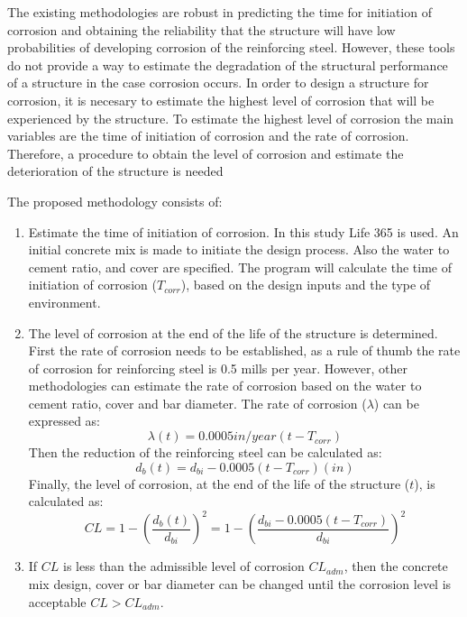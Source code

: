 The existing methodologies are robust in predicting the time for initiation of corrosion and obtaining the reliability that the structure will have low probabilities of developing corrosion of the reinforcing steel. However, these tools do not provide a way to estimate the degradation of the structural performance of a structure in the case corrosion occurs. In order to design a structure for corrosion, it is necesary to estimate the highest level of corrosion that will be experienced by the structure. To estimate the highest level of corrosion the main variables are the time of initiation of corrosion and the rate of corrosion. Therefore, a procedure to obtain the level of corrosion and estimate the deterioration of the structure is needed

The proposed methodology consists of:
\begin{enumerate}
    \item Estimate the time of initiation of corrosion. In this study Life 365 is used. An initial concrete mix is made to initiate the design process. Also the water to cement ratio, and cover are specified. The program will calculate the time of initiation of corrosion ($T_{corr}$), based on the design inputs and the type of environment.
    \item The level of corrosion at the end of the life of the structure is determined. First the rate of corrosion needs to be established, as a rule of thumb the rate of corrosion for reinforcing steel is 0.5 mills per year. However, other methodologies can estimate the rate of corrosion based on the water to cement ratio, cover and bar diameter\cite{Weyers1994}\cite{Thoft-Christensen}. The rate of corrosion ($\lambda$) can be expressed as:
    \begin{equation}
        \lambda(t)=0.0005 in/year (t-T_{corr})
    \end{equation}
    Then the reduction of the reinforcing steel can be calculated as:
    \begin{equation}
    d_{b}(t)=d_{bi}-0.0005(t-T_{corr}) (in)
    \end{equation}
    Finally, the level of corrosion, at the end of the life of the structure ($t$), is calculated as:
    \begin{equation}
    CL=1-\left(\frac{d_{b}(t)}{d_{bi}}\right)^2=1-\left(\frac{d_{bi}-0.0005(t-T_{corr})}{d_{bi}}\right)^2
    \end{equation}
    
    \item If $CL$ is less than the admissible level of corrosion $CL_{adm}$, then the concrete mix design, cover or bar diameter can be changed until the corrosion level is acceptable $CL>CL_{adm}$.
    

\end{enumerate}
